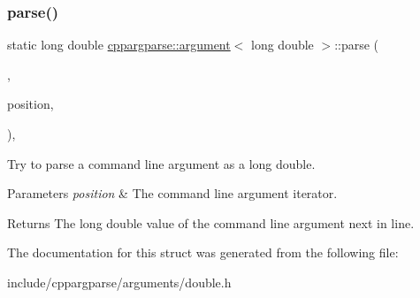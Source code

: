 \subsubsection{\texorpdfstring{parse()}{parse()}}
{\footnotesize\ttfamily static long double \hyperlink{structcppargparse_1_1argument}{cppargparse\+::argument}$<$ long double $>$\+::parse (\begin{DoxyParamCaption}\item[{const types\+::\+Command\+Line\+\_\+t \&}]{,  }\item[{const types\+::\+Command\+Line\+Position\+\_\+t \&}]{position,  }\item[{const types\+::\+Command\+Line\+Arguments\+\_\+t \&}]{ }\end{DoxyParamCaption})\hspace{0.3cm}{\ttfamily [inline]}, {\ttfamily [static]}}



Try to parse a command line argument as a long double. 


\begin{DoxyParams}{Parameters}
{\em position} & The command line argument iterator.\\
\hline
\end{DoxyParams}
\begin{DoxyReturn}{Returns}
The long double value of the command line argument next in line. 
\end{DoxyReturn}


The documentation for this struct was generated from the following file\+:\begin{DoxyCompactItemize}
\item 
include/cppargparse/arguments/double.\+h\end{DoxyCompactItemize}
